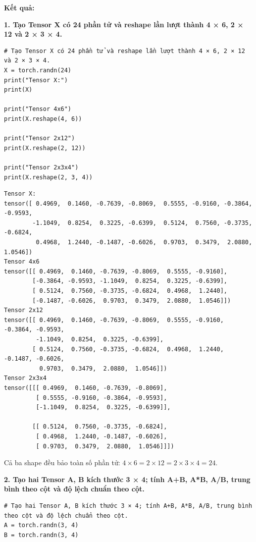 \documentclass[12pt,a4paper]{article}
\begin{document}
\begin{itemize}
\textbf{Kết quả:}

\textbf{1. Tạo Tensor X có 24 phần tử và reshape lần lượt thành 4 × 6, 2 × 12 và 2 × 3 × 4.}
\begin{verbatim}
# Tạo Tensor X có 24 phần tử và reshape lần lượt thành 4 × 6, 2 × 12 và 2 × 3 × 4.
X = torch.randn(24)
print("Tensor X:")
print(X)

print("Tensor 4x6")
print(X.reshape(4, 6))

print("Tensor 2x12")
print(X.reshape(2, 12))

print("Tensor 2x3x4")
print(X.reshape(2, 3, 4))
\end{verbatim}


\begin{verbatim}
Tensor X:
tensor([ 0.4969,  0.1460, -0.7639, -0.8069,  0.5555, -0.9160, -0.3864, -0.9593,
        -1.1049,  0.8254,  0.3225, -0.6399,  0.5124,  0.7560, -0.3735, -0.6824,
         0.4968,  1.2440, -0.1487, -0.6026,  0.9703,  0.3479,  2.0880,  1.0546])
Tensor 4x6
tensor([[ 0.4969,  0.1460, -0.7639, -0.8069,  0.5555, -0.9160],
        [-0.3864, -0.9593, -1.1049,  0.8254,  0.3225, -0.6399],
        [ 0.5124,  0.7560, -0.3735, -0.6824,  0.4968,  1.2440],
        [-0.1487, -0.6026,  0.9703,  0.3479,  2.0880,  1.0546]])
Tensor 2x12
tensor([[ 0.4969,  0.1460, -0.7639, -0.8069,  0.5555, -0.9160, -0.3864, -0.9593,
         -1.1049,  0.8254,  0.3225, -0.6399],
        [ 0.5124,  0.7560, -0.3735, -0.6824,  0.4968,  1.2440, -0.1487, -0.6026,
          0.9703,  0.3479,  2.0880,  1.0546]])
Tensor 2x3x4
tensor([[[ 0.4969,  0.1460, -0.7639, -0.8069],
         [ 0.5555, -0.9160, -0.3864, -0.9593],
         [-1.1049,  0.8254,  0.3225, -0.6399]],

        [[ 0.5124,  0.7560, -0.3735, -0.6824],
         [ 0.4968,  1.2440, -0.1487, -0.6026],
         [ 0.9703,  0.3479,  2.0880,  1.0546]]])
\end{verbatim}

Cả ba shape đều bảo toàn số phần tử: $4\times6=2\times12=2\times3\times4=24$.

\textbf{2. Tạo hai Tensor A, B kích thước 3 × 4; tính A+B, A*B, A/B, trung bình theo cột và độ lệch chuẩn theo cột.}

\begin{verbatim}
# Tạo hai Tensor A, B kích thước 3 × 4; tính A+B, A*B, A/B, trung bình theo cột và độ lệch chuẩn theo cột.
A = torch.randn(3, 4)
B = torch.randn(3, 4)


\end{verbatim}
\end{itemize}
\end{document}
